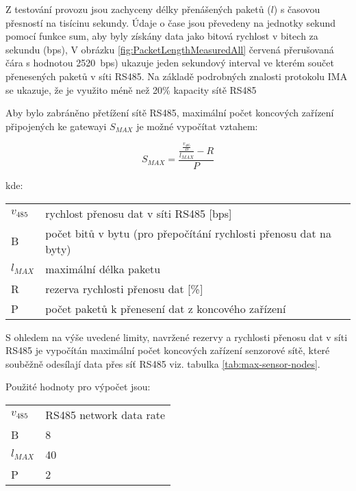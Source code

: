 Z testování provozu jsou zachyceny délky přenášených paketů ($ l $) s časovou přesností na tisícinu sekundy. Údaje o čase jsou převedeny na jednotky sekund pomocí funkce sum, aby byly získány data jako bitová rychlost v bitech za sekundu (bps),
V obrázku \ref{fig:PacketLengthMeasuredAll} červená přerušovaná čára s hodnotou 2520~bps) ukazuje jeden sekundový interval ve kterém součet přenesených paketů v síti RS485.
Na základě podrobných znalosti protokolu IMA se ukazuje, že je využito méně než 20\% kapacity sítě RS485 

Aby bylo zabráněno přetížení sítě RS485, maximální počet koncových zařízení připojených ke gatewayi $ S_{MAX} $ je možné vypočítat vztahem:

\begin{equation}
S_{MAX} = \frac{\frac{\frac{v_{485}}{B}}{l_{MAX}} - R}{P}
\label{equ:max-count-of-sensors}
\end{equation}

kde:

\begin{tabular}{l @{  } l}
$v_{485}$ & rychlost přenosu dat v síti RS485 [bps]\\
 B        & počet bitů v bytu (pro přepočítání rychlosti přenosu dat na byty) \\
$l_{MAX}$ & maximální délka paketu \\
 R        & rezerva rychlosti přenosu dat [\%]\\
 P        & počet paketů k přenesení dat z koncového zařízení \\
\end{tabular}


S ohledem na výše uvedené limity, navržené rezervy a rychlosti přenosu dat v síti RS485 je vypočítán maximální počet koncových zařízení senzorové sítě, které souběžně odesílají data přes síť RS485 viz. tabulka \ref{tab:max-sensor-nodes}.

Použité hodnoty pro výpočet jsou:

\begin{tabular}{l @{ $=$ } l}
$v_{485}$ & RS485 network data rate \\
 B        & 8 \\
$l_{MAX}$ & 40 \\
 P        & 2 \\
\end{tabular}



